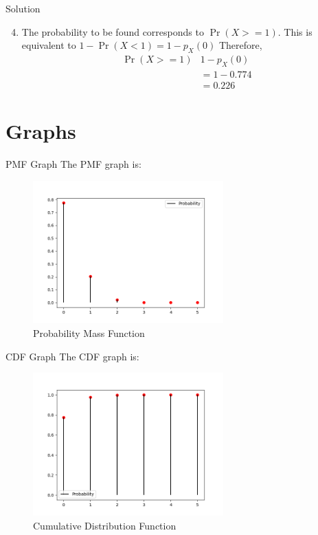 \documentclass{beamer}
\providecommand{\pr}[1]{\ensuremath{\Pr\left(#1\right)}}
\begin{document}
\begin{frame}{Solution}
\begin{enumerate}[label=(\roman*)]
  \setcounter{enumi}{3}
\item The probability to be found corresponds to $\pr{X>=1}$. This is equivalent to $1-\pr{X<1} = 1-p_X(0)$ Therefore,
\begin{align}
    \pr{X>=1} &1-p_X(0) \\
             &= 1-0.774 \\
             &= 0.226
\end{align}
\end{enumerate}
\end{frame}

\section{Graphs}
\begin{frame}{PMF Graph}
The PMF graph is:
    \begin{figure}[!ht]
		\centering
		\includegraphics[width=\textwidth,height=5.5cm,keepaspectratio]{figures/PMF.png}
		\caption{Probability Mass Function}
		\label{fig1}
	\end{figure}
\end{frame}

\begin{frame}{CDF Graph}
The CDF graph is:
    \begin{figure}[!ht]
		\centering
		\includegraphics[width=\textwidth,height=5.5cm,keepaspectratio]{figures/CDF.png}
		\caption{Cumulative Distribution Function}
		\label{fig2}
	\end{figure}
\end{frame}
\end{document}
